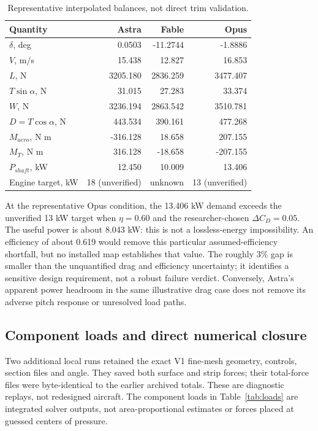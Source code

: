 \documentclass[10pt,letterpaper]{article}
\begin{document}
\begin{table}[H]\centering\small
\caption{Representative interpolated balances, not direct trim validation.}\label{tab:interpolated}
\begin{tabular}{lrrr}\toprule
Quantity & Astra & Fable & Opus\\\midrule
$\delta$, deg &0.0503&-11.2744&-1.8886\\
$V$, m/s &15.438&12.827&16.853\\
$L$, N &3205.180&2836.259&3477.407\\
$T\sin\alpha$, N &31.015&27.283&33.374\\
$W$, N &3236.194&2863.542&3510.781\\
$D=T\cos\alpha$, N &443.534&390.161&477.268\\
$M_{aero}$, N m &-316.128&18.658&207.155\\
$M_T$, N m &316.128&-18.658&-207.155\\
$P_{shaft}$, kW &12.450&10.009&13.406\\
Engine target, kW &18 (unverified)&unknown&13 (unverified)\\\bottomrule
\end{tabular}
\end{table}



At the representative Opus condition, the 13.406 kW demand exceeds the unverified 13 kW target when $\eta=0.60$ and the researcher-chosen $\Delta C_D=0.05$. The useful power is about 8.043 kW: this is not a lossless-energy impossibility. An efficiency of about 0.619 would remove this particular assumed-efficiency shortfall, but no installed map establishes that value. The roughly 3\% gap is smaller than the unquantified drag and efficiency uncertainty; it identifies a sensitive design requirement, not a robust failure verdict. Conversely, Astra's apparent power headroom in the same illustrative drag case does not remove its adverse pitch response or unresolved load paths.

\subsection{Component loads and direct numerical closure}
Two additional local runs retained the exact V1 fine-mesh geometry, controls, section files and angle. They saved both surface and strip forces; their total-force files were byte-identical to the earlier archived totals. These are diagnostic replays, not redesigned aircraft. The component loads in Table~\ref{tab:loads} are integrated solver outputs, not area-proportional estimates or forces placed at guessed centers of pressure.
\end{document}
